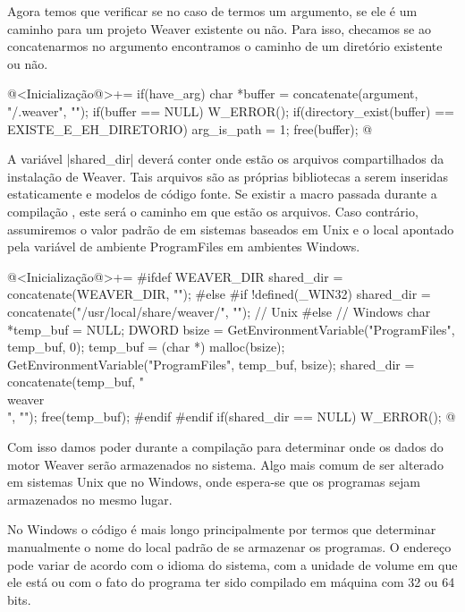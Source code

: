 {

Agora temos que verificar se no caso de termos um argumento, se ele é
um caminho para um projeto Weaver existente ou não. Para isso,
checamos se ao concatenarmos  no argumento
encontramos o caminho de um diretório existente ou não.

\iniciocodigo
@<Inicialização@>+=
if(have_arg){
  char *buffer = concatenate(argument, "/.weaver", "");
  if(buffer == NULL) W_ERROR();
  if(directory_exist(buffer) == EXISTE_E_EH_DIRETORIO){
    arg_is_path = 1;
  }
  free(buffer);
}
@
\fimcodigo


A variável |shared_dir| deverá conter onde estão os arquivos
compartilhados da instalação de Weaver. Tais arquivos são as próprias
bibliotecas a serem inseridas estaticamente e modelos de código
fonte. Se existir a macro passada durante a
compilação , este será o caminho em que estão
os arquivos. Caso contrário, assumiremos o valor padrão
de  em sistemas baseados em Unix e
o local apontado pela variável de ambiente ProgramFiles em ambientes
Windows.

@<Inicialização@>+=
{
#ifdef WEAVER_DIR
  shared_dir = concatenate(WEAVER_DIR, "");
#else
#if !defined(_WIN32)
  shared_dir = concatenate("/usr/local/share/weaver/", ""); // Unix
#else
  { // Windows
    char *temp_buf = NULL;
    DWORD bsize = GetEnvironmentVariable("ProgramFiles", temp_buf, 0);
    temp_buf = (char *) malloc(bsize);
    GetEnvironmentVariable("ProgramFiles", temp_buf, bsize);
    shared_dir = concatenate(temp_buf, "\\weaver\\", "");
    free(temp_buf);
  }
#endif
#endif
  if(shared_dir == NULL) W_ERROR();
}
@
\fimcodigo

Com isso damos poder durante a compilação para determinar onde os
dados do motor Weaver serão armazenados no sistema. Algo mais comum de
ser alterado em sistemas Unix que no Windows, onde espera-se que os
programas sejam armazenados no mesmo lugar.

No Windows o código é mais longo principalmente por termos que
determinar manualmente o nome do local padrão de se armazenar os
programas. O endereço pode variar de acordo com o idioma do sistema,
com a unidade de volume em que ele está ou com o fato do programa ter
sido compilado em máquina com 32 ou 64 bits.

}
